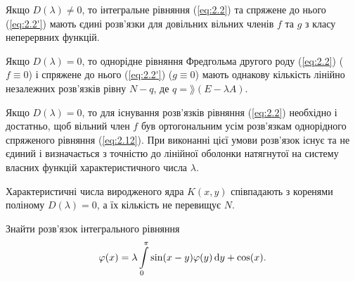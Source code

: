 \begin{theorem}
	Якщо $D(\lambda) \ne 0$, то інтегральне рівняння (\ref{eq:2.2}) та спряжене до нього (\ref{eq:2.2'}) мають єдині розв'язки для довільних вільних членів $f$ та $g$ з класу неперервних функцій.
\end{theorem}
\begin{theorem}
	Якщо $D(\lambda) = 0$, то однорідне рівняння Фредгольма другого роду (\ref{eq:2.2}) ($f \equiv 0$) і спряжене до нього (\ref{eq:2.2'}) ($g \equiv 0$) мають однакову кількість лінійно незалежних розв'язків рівну $N - q$, де $q = \rang(E - \lambda A)$.
\end{theorem}
\begin{theorem}
	Якщо $D(\lambda) = 0$, то для існування розв'язків рівняння (\ref{eq:2.2}) необхідно і достатньо, щоб вільний член $f$ був ортогональним усім розв'язкам однорідного спряженого рівняння (\ref{eq:2.12}). При виконанні цієї умови розв'язок існує та не єдиний і визначається з точністю до лінійної оболонки натягнутої на систему власних функцій характеристичного числа $\lambda$.
\end{theorem}
\begin{corollary}
	Характеристичні числа виродженого ядра $K(x, y)$ співпадають з коренями поліному $D(\lambda) = 0$, а їх кількість не перевищує $N$.
\end{corollary}
\begin{example}
	Знайти розв’язок інтегрального рівняння \[ \varphi(x) = \lambda \displaystyle\int\limits_0^\pi \sin(x - y) \varphi(y) \mathop{}\!\mathrm{d} y + \cos(x). \]
\end{example}
